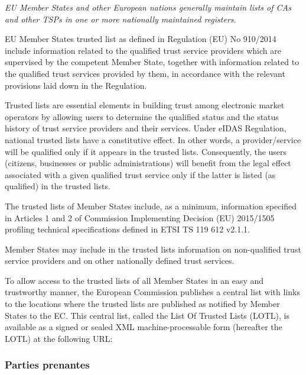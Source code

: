 \documentclass{tnreport}
\begin{document}
{\em
EU Member States and other European nations generally maintain lists of CAs and other TSPs in one or more nationally maintained registers.    

EU Member States trusted list as defined in Regulation (EU) No 910/2014 include information related to the qualified trust service providers which are supervised by the competent Member State, together with information related to the qualified trust services provided by them, in accordance with the relevant provisions laid down in the Regulation.

Trusted lists are essential elements in building trust among electronic market operators by allowing users to determine the qualified status and the status history of trust service providers and their services. Under eIDAS Regulation, national trusted lists have a constitutive effect. In other words, a provider/service will be qualified only if it appears in the trusted lists. Consequently, the users (citizens, businesses or public administrations) will benefit from the legal effect associated with a given qualified trust service only if the latter is listed (as qualified) in the trusted lists.

The trusted lists of Member States include, as a minimum, information specified in Articles 1 and 2 of Commission Implementing Decision (EU) 2015/1505 profiling technical specifications defined in ETSI TS 119 612 v2.1.1.

Member States may include in the trusted lists information on non-qualified trust service providers and on other nationally defined trust services.

To allow access to the trusted lists of all Member States in an easy and trustworthy manner, the European Commission publishes a central list with links to the locations where the trusted lists are published as notified by Member States to the EC. This central list, called the List Of Trusted Lists (LOTL), is available as a signed or sealed XML machine-processable form (hereafter the LOTL) at the following URL: %
}

\subsubsection{Parties prenantes}
\end{document}
